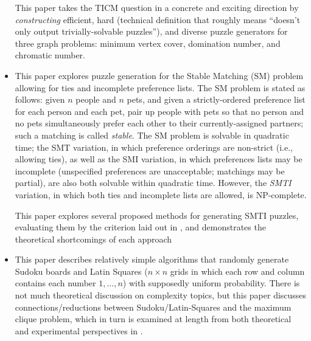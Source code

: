 \documentclass{extarticle}
\begin{document}
\begin{itemize}
\begin{annotation}
      This paper takes the TICM question in a concrete and exciting direction
      by \emph{constructing} efficient, hard (technical definition that roughly
      means ``doesn't only output trivially-solvable puzzles''), and diverse
      puzzle generators for three graph problems: minimum vertex cover,
      domination number, and chromatic number.
    \end{annotation}

  \item {}

    \begin{annotation}
      This paper explores puzzle generation for the Stable Matching (SM)
      problem allowing for ties and incomplete preference lists.  The SM
      problem is stated as follows: given \(n\) people and \(n\) pets, and
      given a strictly-ordered preference list for each person and each pet,
      pair up people with pets so that no person and no pets simultaneously
      prefer each other to their currently-assigned partners; such a matching
      is called \emph{stable}.  The SM problem is solvable in quadratic time;
      the SMT variation, in which preference orderings are non-strict (i.e.,
      allowing ties), as well as the SMI variation, in which preferences lists
      may be incomplete (unspecified preferences are unacceptable; matchings
      may be partial), are also both solvable within quadratic time.  However,
      the \emph{SMTI} variation, in which both ties and incomplete lists are
      allowed, is NP-complete.

      This paper explores several proposed methods for generating SMTI puzzles,
      evaluating them by the criterion laid out in
      \textcite{test-gen-complexity}, and demonstrates the theoretical
      shortcomings of each approach
    \end{annotation}

  \item {}

    \begin{annotation}
      This paper describes relatively simple algorithms that randomly generate
      Sudoku boards and Latin Squares (\(n \times n\) grids in which each row
      and column contains each number \(1, \dotsc, n\)) with supposedly uniform
      probability.  There is not much theoretical discussion on complexity
      topics, but this paper discusses connections/reductions between
      Sudoku/Latin-Squares and the maximum clique problem, which in turn is
      examined at length from both theoretical and experimental perspectives in
      \textcite{maximum-clique-generators}.
    \end{annotation}


\end{itemize}
\end{document}
